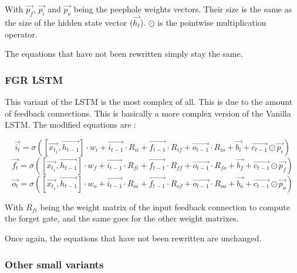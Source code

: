 With $\overrightarrow{p_f}$, $\overrightarrow{p_i}$ and $\overrightarrow{p_o}$ being the peephole weights vectors. Their size is the same as the size of the hidden state vector ($\overrightarrow{h_t}$). $\odot$ is the pointwise multiplication operator.

The equations that have not been rewritten simply stay the same.

\subsubsection{\acf{FGR} \ac{LSTM}}
This variant of the \ac{LSTM} is the most complex of all. This is due to the amount of feedback connections. This is basically a more complex version of the Vanilla \ac{LSTM}. The modified equations are :

\begin{equation}\label{eq:inputGFGR}
  \overrightarrow{i_t}=\sigma ([\overrightarrow{x_{t_1}},\overrightarrow{h_{t-1}}]\cdot w_i  + \overrightarrow{i_{t-1}}\cdot R_{ii} + \overrightarrow{f_{t-1}}\cdot R_{if} + \overrightarrow{o_{t-1}}\cdot R_{io} + \overrightarrow{b_i} +\overrightarrow{c_{t-1}}\odot \overrightarrow{p_i})
\end{equation}
\begin{equation}\label{eq:forgetGFGR}
  \overrightarrow{f_t}=\sigma ([\overrightarrow{x_{t_1}},\overrightarrow{h_{t-1}}]\cdot w_f  + \overrightarrow{i_{t-1}}\cdot R_{fi} + \overrightarrow{f_{t-1}}\cdot R_{ff} + \overrightarrow{o_{t-1}}\cdot R_{fo} + \overrightarrow{b_f} +\overrightarrow{c_{t-1}}\odot \overrightarrow{p_f})
\end{equation}
\begin{equation}\label{eq:ouputGFGR}
  \overrightarrow{o_t}=\sigma ([\overrightarrow{x_{t_1}},\overrightarrow{h_{t-1}}]\cdot w_o + \overrightarrow{i_{t-1}}\cdot R_{oi} + \overrightarrow{f_{t-1}}\cdot R_{of} + \overrightarrow{o_{t-1}}\cdot R_{oo} + \overrightarrow{b_o} +\overrightarrow{c_{t-1}}\odot \overrightarrow{p_o})
\end{equation}

With $R_{fi}$ being the weight matrix of the input feedback connection to compute the forget gate, and the same goes for the other weight matrixes.

Once again, the equations that have not been rewritten are unchanged.

\subsubsection{Other small variants}

